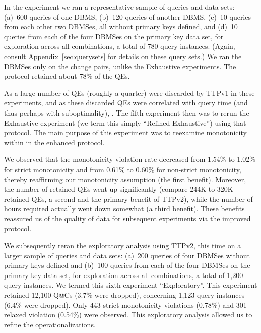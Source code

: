 \documentclass[prodmode,acmtods]{acmsmall}
\makeatletter
\def\QatC{Q{@}C}
\makeatother
\begin{document}
In the experiment we ran a representative sample of queries and data sets: (a)~600 queries of one
\hbox{DBMS}, (b)~120 queries of another \hbox{DBMS}, (c)~10 queries
from each other two \hbox{DBMSes}, all without primary keys defined, and (d)~10 queries
from each of the four \hbox{DBMSes} on the primary key data set, for exploration
across all combinations, a total of 780 query instances.  (Again, consult
Appendix~\ref{sec:querysets} for details on these query sets.)
We ran the \hbox{DBMSes} only on the
change pairs, unlike the Exhaustive experiments. The protocol retained about 78\% of the QEs. 

As a large number of QEs (roughly a quarter) were discarded by TTPv1 in
these experiments, and as these discarded QEs were correlated with query
time (and thus perhaps with suboptimality),
.
The fifth experiment then was to rerun the Exhaustive experiment  (we term this simply
``Refined Exhaustive'') using that protocol. The main purpose of this experiment 
was to reexamine monotonicity within in the enhanced
protocol.

We observed that the monotonicity violation rate decreased
from 1.54\% to 1.02\% for strict monotonicity and from 0.61\% to 0.60\% for
non-strict monotonicity, thereby reaffirming our monotonicity assumption
(the first benefit). Moreover, the number of retained QEs went up
significantly (compare 244K to 320K retained QEs, a second and the primary benefit of TTPv2), 
while the number of hours required actually went down somewhat (a third benefit).
These benefits reassured us of the quality of data 
for subsequent experiments via the improved protocol.

We subsequently reran the exploratory analysis using TTPv2, this time on a larger sample of queries and data sets:
(a)~200 queries of four \hbox{DBMSes} without primary keys defined and
(b)~100 queries from each of the four \hbox{DBMSes} on the primary key data set,
for exploration across all combinations, a total of 1,200 query instances. %
We termed this sixth experiment ``Exploratory''. This experiment 
retained 12,100 {\QatC}s (3.7\% were dropped), concerning 1,123 query
instances (6.4\% were dropped). Only 443 strict monotonicity violations (0.78\%) and 301 relaxed
violation (0.54\%) were observed. This exploratory analysis allowed us to refine
the operationalizations.
\end{document}
